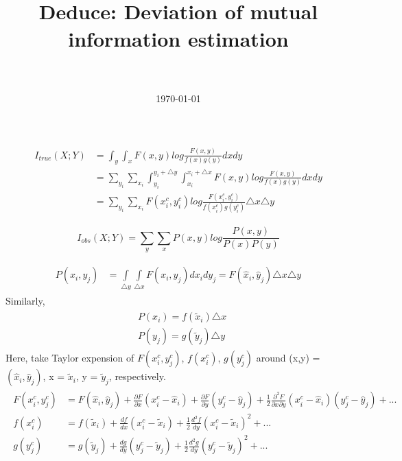 \documentclass[paper=a4, fontsize=11pt]{article} %
\title{
\normalfont \normalsize
\horrule{0.5pt} \\[0.4cm] %
\huge Deduce: Deviation of mutual information estimation \\ %
\horrule{2pt} \\[0.5cm] %
}
\date{\normalsize\today} %
\numberwithin{equation}{section} %
\numberwithin{figure}{section} %
\numberwithin{table}{section} %
\begin{document}
\maketitle %




\begin{align}
\begin{split}
I_{true}(X;Y) &= \int_y \int_x F(x,y)log\frac{F(x,y)}{f(x)g(y)}dxdy\\
&=\sum_{y_i}\sum_{x_i}\int_{y_i}^{y_i + \triangle y} \int_{x_i}^{x_i + \triangle x} F(x,y)log\frac{F(x,y)}{f(x)g(y)}dxdy\\
&=\sum_{y_i}\sum_{x_i} F(x_i^c,y_i^c)log\frac{F(x_i^c,y_i^c)}{f(x_i^c)g(y_i^c)}\triangle x \triangle y
\end{split}
\end{align}

\begin{equation}
  I_{obs}(X;Y) 	= \sum_y \sum_x P(x,y)log\frac{P(x,y)}{P(x)P(y)}
\end{equation}

\begin{align}
\begin{split}
P(x_i,y_j) &= \int\limits_{\triangle y} \int\limits_{\triangle x} F(x_i,y_j)dx_idy_j = F(\hat{x}_i, \hat{y}_j)\triangle x \triangle y
\end{split}
\end{align}
Similarly,
\begin{align}
\begin{split}
&P(x_i) = f(\tilde{x}_i)\triangle x\\
&P(y_j) = g(\tilde{y}_j)\triangle y
\end{split}
\end{align}
Here, take Taylor expension of $F(x_i^c,y_j^c)$, $f(x_i^c)$, $g(y_j^c)$ around (x,y) = $(\hat{x}_i, \hat{y}_j)$, x = $\tilde{x}_i$, y = $\tilde{y}_j$, respectively.
\begin{align}
	\begin{split}
		F(x_i^c, y_j^c) &= F(\hat{x}_i, \hat{y}_j) + \frac{\partial F}{\partial x}(x_i^c-\hat{x}_i) + \frac{\partial F}{\partial y}(y_j^c-\hat{y}_j) +  \frac{1}{2}\frac{\partial^2 F}{\partial x\partial y}(x_i^c-\hat{x}_i)(y_j^c-\hat{y}_j) + ... \\
		f(x_i^c) &= f(\tilde{x}_i) + \frac{df}{dx}(x_i^c-\tilde{x}_i) + \frac{1}{2}\frac{d^2f}{dy}(x_i^c-\tilde{x}_i)^2 + ...\\
		g(y_j^c) &= g(\tilde{y}_j) + \frac{dg}{dy}(y_j^c-\tilde{y}_j) + \frac{1}{2}\frac{d^2g}{dy}(y_j^c-\tilde{y}_j)^2 + ...
	\end{split}
\end{align}
\end{document}
